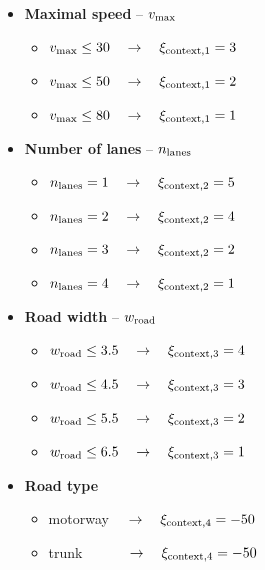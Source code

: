             \begin{itemize}
                \item \textbf{Maximal speed} -- $v_{\rm{max}}$
                    \begin{itemize}
                        \item $v_{\rm{max}}\leq30\quad\to\quad\xi_{\rm{context,1}}=3$
                        \item $v_{\rm{max}}\leq50\quad\to\quad\xi_{\rm{context,1}}=2$
                        \item $v_{\rm{max}}\leq80\quad\to\quad\xi_{\rm{context,1}}=1$
                    \end{itemize}
                \item \textbf{Number of lanes} -- $n_{\rm{lanes}}$
                    \begin{itemize}
                        \item $n_{\rm{lanes}}=1\quad\to\quad\xi_{\rm{context,2}}=5$
                        \item $n_{\rm{lanes}}=2\quad\to\quad\xi_{\rm{context,2}}=4$
                        \item $n_{\rm{lanes}}=3\quad\to\quad\xi_{\rm{context,2}}=2$
                        \item $n_{\rm{lanes}}=4\quad\to\quad\xi_{\rm{context,2}}=1$
                    \end{itemize}
                \item \textbf{Road width} -- $w_{\rm{road}}$
                    \begin{itemize}
                        \item $w_{\rm{road}}\leq3.5\quad\to\quad\xi_{\rm{context,3}}=4$
                        \item $w_{\rm{road}}\leq4.5\quad\to\quad\xi_{\rm{context,3}}=3$
                        \item $w_{\rm{road}}\leq5.5\quad\to\quad\xi_{\rm{context,3}}=2$
                        \item $w_{\rm{road}}\leq6.5\quad\to\quad\xi_{\rm{context,3}}=1$
                    \end{itemize}
                \item \textbf{Road type}
                    \begin{itemize}
                        \item motorway $\quad\to\quad\xi_{\rm{context,4}}=-50$
                        \item trunk $\quad\qquad\to\quad\xi_{\rm{context,4}}=-50$

\end{itemize}
\end{itemize}
